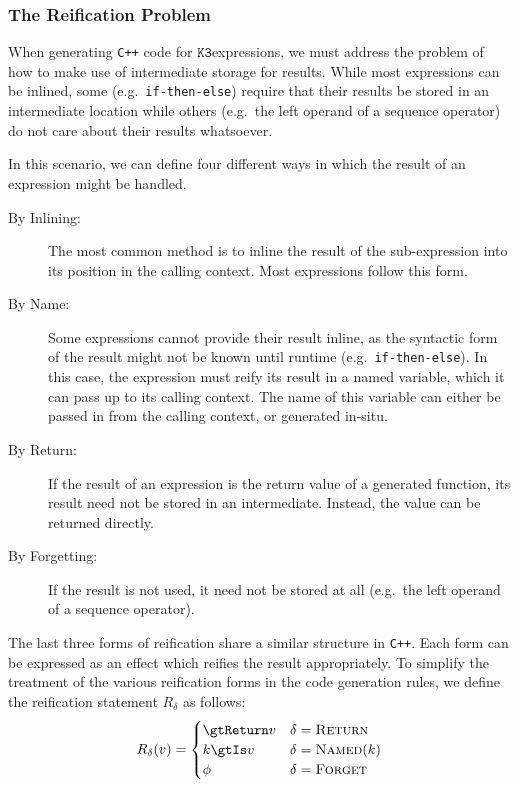 \documentclass{article}
\newcommand{\K}{\ensuremath{\texttt{K3}}}
\begin{document}
    \subsubsection{The Reification Problem}

    When generating \texttt{C++} code for \K expressions, we must address the problem of
    how to make use of intermediate storage for results. While most expressions can be inlined, some
    (e.g.~\texttt{if-then-else}) require that their results be stored in an intermediate location
    while others (e.g.~the left operand of a sequence operator) do not care about their results
    whatsoever.

    In this scenario, we can define four different ways in which the result of an expression might
    be handled.

    \begin{description}
        \item[By Inlining:] The most common method is to inline the result of the sub-expression
            into its position in the calling context. Most expressions follow this form.
        \item[By Name:] Some expressions cannot provide their result inline, as the syntactic form
            of the result might not be known until runtime (e.g.~\texttt{if-then-else}). In this
            case, the expression must reify its result in a named variable, which it can pass up to
            its calling context. The name of this variable can either be passed in from the calling
            context, or generated in-situ.
        \item[By Return:] If the result of an expression is the return value of a generated
            function, its result need not be stored in an intermediate. Instead, the value can be
            returned directly.
        \item[By Forgetting:] If the result is not used, it need not be stored at all (e.g.~the left
            operand of a sequence operator).
    \end{description}

    The last three forms of reification share a similar structure in \texttt{C++}. Each form can be
    expressed as an effect which reifies the result appropriately. To simplify the treatment of the
    various reification forms in the code generation rules, we define the reification statement
    $R_\delta$ as follows:
%
    \begin{align*}
        R_\delta(v) = \begin{cases}
            \gtReturn v & \delta = \textsc{Return} \\
            k \gtIs v & \delta = \textsc{Named$(k)$} \\
            \phi & \delta = \textsc{Forget}
        \end{cases}
    \end{align*}
\end{document}
